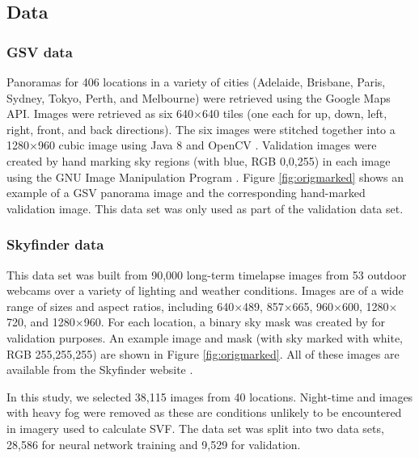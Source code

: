 \documentclass[final,3p,times,authoryear]{elsarticle}
\begin{document}
\subsection{Data}\label{sec:data}



\subsubsection{GSV data}\label{sec:gsvdata}
Panoramas for 406 locations in a variety of cities (Adelaide, Brisbane, Paris, Sydney, Tokyo, Perth, and Melbourne) were retrieved using the Google Maps API. Images were retrieved as six 640$\times$640 tiles (one each for up, down, left, right, front, and back directions). The six images were stitched together into a 1280$\times$960 cubic image using Java 8 \citep{Oracle2018} and OpenCV \citep {Bradski2000}. Validation images were created by hand marking sky regions (with blue, RGB 0,0,255) in each image using the GNU Image Manipulation Program \citep{GIMP2019}. Figure \ref{fig:origmarked} shows an example of a GSV panorama image and the corresponding hand-marked validation image. This data set was only used as part of the validation data set.

\subsubsection{Skyfinder data}\label{sec:finderdata}
This data set was built from 90,000 long-term timelapse images from 53 outdoor webcams over a variety of lighting and weather conditions. Images are of a wide range of sizes and aspect ratios, including 640$\times$489, 857$\times$665, 960$\times$600, 1280$\times$720, and 1280$\times$960. For each location, a binary sky mask was created by \cite{Mihail2016} for validation purposes. An example image and mask (with sky marked with white, RGB 255,255,255) are shown in Figure \ref{fig:origmarked}. All of these images are available from the Skyfinder website \citep{Mihail2015}.

In this study, we selected 38,115 images from 40 locations. Night-time and images with heavy fog were removed as these are conditions unlikely to be encountered in imagery used to calculate SVF. The data set was split into two data sets, 28,586 for neural network training and 9,529 for validation.

\end{document}
